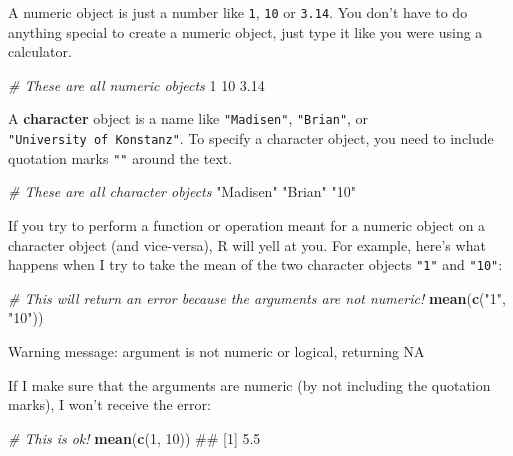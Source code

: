 \documentclass[]{book}
\newenvironment{Shaded}{\begin{snugshade}}{\end{snugshade}}
\newcommand{\KeywordTok}[1]{\textcolor[rgb]{0.13,0.29,0.53}{\textbf{#1}}}
\newcommand{\DecValTok}[1]{\textcolor[rgb]{0.00,0.00,0.81}{#1}}
\newcommand{\FloatTok}[1]{\textcolor[rgb]{0.00,0.00,0.81}{#1}}
\newcommand{\StringTok}[1]{\textcolor[rgb]{0.31,0.60,0.02}{#1}}
\newcommand{\CommentTok}[1]{\textcolor[rgb]{0.56,0.35,0.01}{\textit{#1}}}
\newcommand{\NormalTok}[1]{#1}
\theoremstyle{definition}
\theoremstyle{definition}
\theoremstyle{remark}
\begin{document}
A numeric object is just a number like \texttt{1}, \texttt{10} or
\texttt{3.14}. You don't have to do anything special to create a numeric
object, just type it like you were using a calculator.

\begin{Shaded}
\begin{Highlighting}[]
\CommentTok{# These are all numeric objects}
\DecValTok{1}
\DecValTok{10}
\FloatTok{3.14}
\end{Highlighting}
\end{Shaded}

A \textbf{character} object is a name like \texttt{"Madisen"},
\texttt{"Brian"}, or \texttt{"University\ of\ Konstanz"}. To specify a
character object, you need to include quotation marks \texttt{""} around
the text.

\begin{Shaded}
\begin{Highlighting}[]
\CommentTok{# These are all character objects}
\StringTok{"Madisen"}
\StringTok{"Brian"}
\StringTok{"10"}
\end{Highlighting}
\end{Shaded}

If you try to perform a function or operation meant for a numeric object
on a character object (and vice-versa), R will yell at you. For example,
here's what happens when I try to take the mean of the two character
objects \texttt{"1"} and \texttt{"10"}:

\begin{Shaded}
\begin{Highlighting}[]
\CommentTok{# This will return an error because the arguments are not numeric!}
\KeywordTok{mean}\NormalTok{(}\KeywordTok{c}\NormalTok{(}\StringTok{"1"}\NormalTok{, }\StringTok{"10"}\NormalTok{))}
\end{Highlighting}
\end{Shaded}

Warning message: argument is not numeric or logical, returning NA

If I make sure that the arguments are numeric (by not including the
quotation marks), I won't receive the error:

\begin{Shaded}
\begin{Highlighting}[]
\CommentTok{# This is ok!}
\KeywordTok{mean}\NormalTok{(}\KeywordTok{c}\NormalTok{(}\DecValTok{1}\NormalTok{, }\DecValTok{10}\NormalTok{))}
\NormalTok{## [1] 5.5}
\end{Highlighting}
\end{Shaded}
\end{document}
